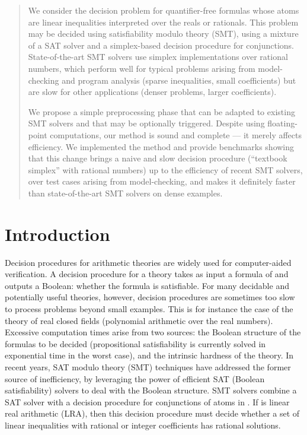 \maketitle

\newcommand{\soft}[1]{\textsc{#1}}
\newcommand{\ve}[1]{\mathbf{#1}}
\newcommand{\algo}[1]{\textsc{#1}}

\begin{abstract}
We consider the decision problem for quantifier-free formulas whose atoms are linear inequalities interpreted over the reals or rationals. This problem may be decided using satisfiability modulo theory (SMT), using a mixture of a SAT solver and a simplex-based decision procedure for conjunctions. State-of-the-art SMT solvers use simplex implementations over rational numbers, which perform well for typical problems arising from model-checking and program analysis (sparse inequalities, small coefficients) but are slow for other applications (denser problems, larger coefficients).

We propose a simple preprocessing phase that can be adapted to existing SMT solvers and that may be optionally triggered. Despite using floating-point computations, our method is sound and complete --- it merely affects efficiency. We implemented the method and provide benchmarks showing that this change brings a naive and slow decision procedure (``textbook simplex'' with rational numbers) up to the efficiency of recent SMT solvers, over test cases arising from model-checking, and makes it definitely faster than state-of-the-art SMT solvers on dense examples. 
\end{abstract}
\section{Introduction}
Decision procedures for arithmetic theories are widely used for computer-aided verification. A decision procedure for a theory  takes as input a formula of  and outputs a Boolean: whether the formula is satisfiable. For many decidable and potentially useful theories, however, decision procedures are sometimes too slow to process problems beyond small examples. This is for instance the case of the theory of real closed fields (polynomial arithmetic over the real numbers). Excessive computation times arise from two sources: the Boolean structure of the formulas to be decided (propositional satisfiability is currently solved in exponential time in the worst case), and the intrinsic hardness of the theory. In recent years, SAT modulo theory (SMT) techniques have addressed the former source of inefficiency, by leveraging the power of efficient SAT (Boolean satisfiability) solvers to deal with the Boolean structure. SMT solvers combine a SAT solver with a decision procedure for conjunctions of atoms in . If  is linear real arithmetic (LRA), then this decision procedure must decide whether a set of linear inequalities with rational or integer coefficients has rational solutions.

